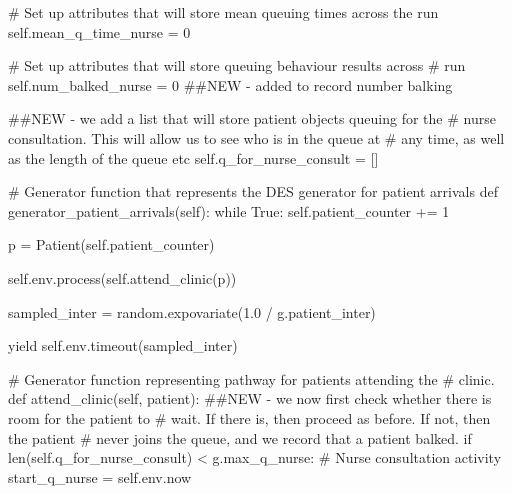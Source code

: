 \documentclass[
  letterpaper,
  DIV=11,
  numbers=noendperiod]{scrreprt}
\newenvironment{Shaded}{\begin{snugshade}}{\end{snugshade}}
\newcommand{\BuiltInTok}[1]{\textcolor[rgb]{0.00,0.23,0.31}{#1}}
\newcommand{\CommentTok}[1]{\textcolor[rgb]{0.37,0.37,0.37}{#1}}
\newcommand{\ControlFlowTok}[1]{\textcolor[rgb]{0.00,0.23,0.31}{#1}}
\newcommand{\DecValTok}[1]{\textcolor[rgb]{0.68,0.00,0.00}{#1}}
\newcommand{\FloatTok}[1]{\textcolor[rgb]{0.68,0.00,0.00}{#1}}
\newcommand{\KeywordTok}[1]{\textcolor[rgb]{0.00,0.23,0.31}{#1}}
\newcommand{\NormalTok}[1]{\textcolor[rgb]{0.00,0.23,0.31}{#1}}
\newcommand{\OperatorTok}[1]{\textcolor[rgb]{0.37,0.37,0.37}{#1}}
\newcommand{\VariableTok}[1]{\textcolor[rgb]{0.07,0.07,0.07}{#1}}
\begin{document}
\begin{tcolorbox}
\begin{Shaded}
\begin{Highlighting}[]
        \CommentTok{\# Set up attributes that will store mean queuing times across the run}
        \VariableTok{self}\NormalTok{.mean\_q\_time\_nurse }\OperatorTok{=} \DecValTok{0}

        \CommentTok{\# Set up attributes that will store queuing behaviour results across}
        \CommentTok{\# run}
        \VariableTok{self}\NormalTok{.num\_balked\_nurse }\OperatorTok{=} \DecValTok{0} \CommentTok{\#\#NEW {-} added to record number balking}

        \CommentTok{\#\#NEW {-} we add a list that will store patient objects queuing for the}
        \CommentTok{\# nurse consultation.  This will allow us to see who is in the queue at}
        \CommentTok{\# any time, as well as the length of the queue etc}
        \VariableTok{self}\NormalTok{.q\_for\_nurse\_consult }\OperatorTok{=}\NormalTok{ []}

    \CommentTok{\# Generator function that represents the DES generator for patient arrivals}
    \KeywordTok{def}\NormalTok{ generator\_patient\_arrivals(}\VariableTok{self}\NormalTok{):}
        \ControlFlowTok{while} \VariableTok{True}\NormalTok{:}
            \VariableTok{self}\NormalTok{.patient\_counter }\OperatorTok{+=} \DecValTok{1}

\NormalTok{            p }\OperatorTok{=}\NormalTok{ Patient(}\VariableTok{self}\NormalTok{.patient\_counter)}

            \VariableTok{self}\NormalTok{.env.process(}\VariableTok{self}\NormalTok{.attend\_clinic(p))}

\NormalTok{            sampled\_inter }\OperatorTok{=}\NormalTok{ random.expovariate(}\FloatTok{1.0} \OperatorTok{/}\NormalTok{ g.patient\_inter)}

            \ControlFlowTok{yield} \VariableTok{self}\NormalTok{.env.timeout(sampled\_inter)}

    \CommentTok{\# Generator function representing pathway for patients attending the}
    \CommentTok{\# clinic.}
    \KeywordTok{def}\NormalTok{ attend\_clinic(}\VariableTok{self}\NormalTok{, patient):}
        \CommentTok{\#\#NEW {-} we now first check whether there is room for the patient to}
        \CommentTok{\# wait.  If there is, then proceed as before.  If not, then the patient}
        \CommentTok{\# never joins the queue, and we record that a patient balked.}
        \ControlFlowTok{if} \BuiltInTok{len}\NormalTok{(}\VariableTok{self}\NormalTok{.q\_for\_nurse\_consult) }\OperatorTok{\textless{}}\NormalTok{ g.max\_q\_nurse:}
            \CommentTok{\# Nurse consultation activity}
\NormalTok{            start\_q\_nurse }\OperatorTok{=} \VariableTok{self}\NormalTok{.env.now}


\end{Highlighting}
\end{Shaded}
\end{tcolorbox}
\end{document}
